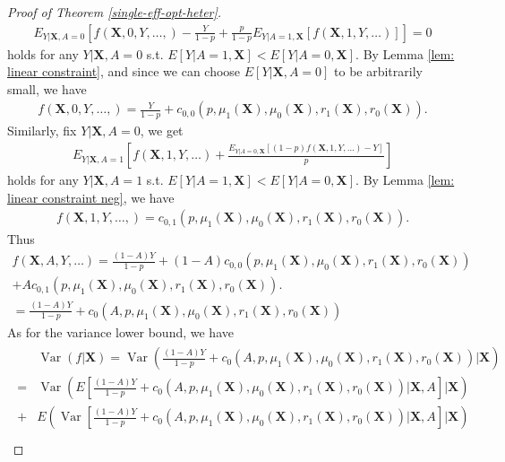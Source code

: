 \documentclass[11pt]{article}
\theoremstyle{referenceplain}
\theoremstyle{referencedefinition}
\theoremstyle{referenceremark}
\begin{document}
\begin{proof}[Proof of Theorem \ref{single-eff-opt-heter}]
\begin{align}
    E_{Y|\mathbf{X},A=0}\left[f(\mathbf{X},0,Y,\dots,)-\frac{Y}{1-p} + \frac{p}{1-p}E_{Y|A=1,\mathbf{X}}[ f(\mathbf{X},1,Y,\dots)]\right]=0
\end{align}
holds for any  $Y|\mathbf{X},A=0$ s.t. $E[Y|A=1,\mathbf{X}] < E[Y|A=0,\mathbf{X}]$. By Lemma \ref{lem: linear constraint}, and since we can choose $E[Y|\mathbf{X},A=0]$ to be arbitrarily small,  we have
\begin{align*}
    f(\mathbf{X},0,Y,\dots,) = \frac{Y}{1-p} + c_{0,0}(p,\mu_1(\mathbf{X}),\mu_0(\mathbf{X}),r_1(\mathbf{X}),r_0(\mathbf{X})).
\end{align*}
Similarly, fix $Y|\mathbf{X},A=0$, we get
\begin{align}
    E_{Y|\mathbf{X},A=1}\left[f(\mathbf{X},1,Y,\dots) + \frac{E_{Y|A=0,\mathbf{X}}[ (1-p) f(\mathbf{X},1,Y,\dots)-Y]}{p}\right]
\end{align}
holds for any $Y|\mathbf{X},A=1$ s.t.  $E[Y|A=1,\mathbf{X}] < E[Y|A=0,\mathbf{X}]$. By Lemma \ref{lem: linear constraint neg}, we have
    \begin{align*}
        f(\mathbf{X},1,Y,\dots,) =  c_{0,1}(p,\mu_1(\mathbf{X}),\mu_0(\mathbf{X}),r_1(\mathbf{X}),r_0(\mathbf{X})).
    \end{align*}
Thus
\begin{align*}
    f(\mathbf{X},A,Y,\dots) = \frac{(1-A)Y}{1-p} + (1-A) c_{0,0}(p,\mu_1(\mathbf{X}),\mu_0(\mathbf{X}),r_1(\mathbf{X}),r_0(\mathbf{X}))\\+ A c_{0,1}(p,\mu_1(\mathbf{X}),\mu_0(\mathbf{X}),r_1(\mathbf{X}),r_0(\mathbf{X})).\\
    =\frac{(1-A)Y}{1-p} + c_0(A,p,\mu_1(\mathbf{X}),\mu_0(\mathbf{X}),r_1(\mathbf{X}),r_0(\mathbf{X}))
\end{align*}
As for the variance lower bound, we have
    \begin{align}\label{single-var-lb-tau-}
    \begin{aligned}
       & \operatorname{Var}(f|\mathbf{X})=\operatorname{Var}\left(\frac{(1-A)Y}{1-p}+c_0(A,p,\mu_1(\mathbf{X}),\mu_0(\mathbf{X}),r_1(\mathbf{X}),r_0(\mathbf{X}))\bigg|\mathbf{X}\right)\\
        =&\operatorname{Var}\left(E\left[\frac{(1-A)Y}{1-p}+c_0(A,p,\mu_1(\mathbf{X}),\mu_0(\mathbf{X}),r_1(\mathbf{X}),r_0(\mathbf{X}))\bigg|\mathbf{X},A\right]\bigg|\mathbf{X}\right)\\
        +&E\left(\operatorname{Var}\left[\frac{(1-A)Y}{1-p}+c_0(A,p,\mu_1(\mathbf{X}),\mu_0(\mathbf{X}),r_1(\mathbf{X}),r_0(\mathbf{X}))\bigg|\mathbf{X},A\right]\bigg|\mathbf{X}\right)\\

\end{aligned}
\end{align}
\end{proof}
\end{document}
